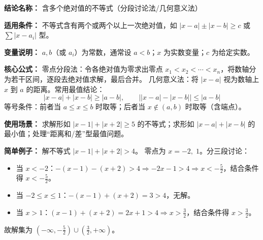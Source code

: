 \textbf{结论名称：} 含多个绝对值的不等式（分段讨论法/几何意义法）

\textbf{适用条件：} 不等式含有两个或两个以上一次绝对值，如 \( |x-a|\pm|x-b|\ge c \) 或 \(\sum |x-a_i| \) 型。

\textbf{变量说明：} \(a,b\)（或 \(a_i\)）为常数，通常设 \(a<b\)；\(x\) 为实数变量；\(c\) 为给定实数。

\textbf{核心公式：} 
零点分段法：令各绝对值为零求出零点 \(x_1<x_2<\cdots<x_n\)，将数轴分为若干区间，逐段去绝对值求解，最后合并。
几何意义法：将 \(|x-a|\) 视为数轴上 \(x\) 到 \(a\) 的距离。常用最值结论：
\[
\boxed{|x-a|+|x-b|\ge |a-b|,\qquad \bigl| |x-a|-|x-b| \bigr|\le |a-b|}
\]
等号条件：前者当 \(a\le x\le b\) 时取等；后者当 \(x\notin(a,b)\) 时取等（含端点）。

\textbf{使用场景：} 
求解形如 \(|x-1|+|x+2|\ge 5\) 的不等式；求形如 \(|x-a|+|x-b|\) 的最小值；处理“距离和/差”型最值问题。

\textbf{简单例子：}
解不等式 \(|x-1|+|x+2|>4\)。
零点为 \(x= -2,\;1\)。分三段讨论：
\begin{itemize}
\item 当 \(x<-2\)：\(-(x-1)-(x+2)>4 \Rightarrow -2x-1>4 \Rightarrow x<-\frac{5}{2}\)，结合条件得 \(x<-\frac{5}{2}\)。
\item 当 \(-2\le x\le 1\)：\(-(x-1)+(x+2)=3>4\)，无解。
\item 当 \(x>1\)：\((x-1)+(x+2)=2x+1>4 \Rightarrow x>\frac{3}{2}\)，结合条件得 \(x>\frac{3}{2}\)。
\end{itemize}
故解集为 \((-\infty,-\frac{5}{2})\cup(\frac{3}{2},+\infty)\)。